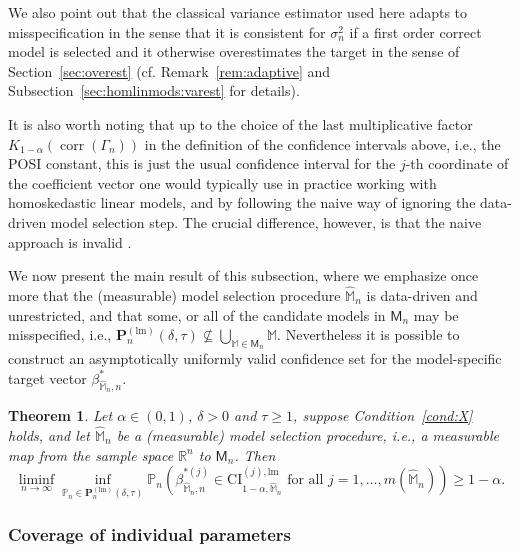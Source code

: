 \documentclass[preprint]{imsart}
\newcommand{\R}{{\mathbb R}}
\newcommand{\M}{\mathbb M}
\DeclareMathOperator{\corr}{corr}
\newtheorem{theorem}{Theorem}[section]
\numberwithin{equation}{section}
\begin{document}
We also point out that the classical variance estimator used here adapts to misspecification in the sense that it is consistent for $\sigma_n^2$ if a first order correct model is selected and it otherwise overestimates the target in the sense of Section~\ref{sec:overest} (cf. Remark~\ref{rem:adaptive} and Subsection~\ref{sec:homlinmods:varest} for details). 
 
It is also worth noting that up to the choice of the last multiplicative factor $K_{1-\alpha}(\corr(\Gamma_n))$ in the definition of the confidence intervals above, i.e., the POSI constant, this is just the usual confidence interval for the $j$-th coordinate of the coefficient vector one would typically use in practice working with homoskedastic linear models, and by following the naive way of ignoring the data-driven model selection step. The crucial difference, however, is that the naive approach is invalid \citep[see, e.g.,][]{leeb13various, bachoc14valid}.

We now present the main result of this subsection, where we emphasize once more that the (measurable) model selection procedure $\hat{\M}_n$ is data-driven and unrestricted, and that some, or all of the candidate models in $\mathsf{M}_n$ may be misspecified, i.e., $\mathbf{P}_n^{(\mathrm{lm})} \left(\delta, \tau \right) \not \subseteq \bigcup_{\M\in\mathsf{M}_n}\M$. Nevertheless it is possible to construct an asymptotically uniformly valid confidence set for the model-specific target vector $\beta_{\hat{\M}_n,n}^*$. 
%
\begin{theorem}\label{thm:homlinmods}
Let $\alpha \in (0, 1)$, $\delta > 0$ and $\tau \ge 1$, suppose Condition~\ref{cond:X} holds, and let $\hat{\mathbb{M}}_n$ be a (measurable) model selection procedure, i.e., a measurable map from the sample space $\R^n$ to $\mathsf{M}_n$. Then
%
\begin{equation*}
\liminf_{n \to \infty} \inf_{\mathbb{P}_n \in \mathbf{P}_n^{(\mathrm{lm})} \left(\delta, \tau \right)} \mathbb{P}_n \left(\beta_{\hat{\mathbb{M}}_n, n}^{* (j)} \in \mathrm{CI}_{1-\alpha, \hat{\mathbb{M}}_n}^{(j), \mathrm{lm}} \text{ for all } j = 1, \hdots, m(\hat{\mathbb{M}}_n)  \right) \geq 1-\alpha.
\end{equation*}
%
\end{theorem}

\subsubsection{Coverage of individual parameters}\label{sec:individual}
\end{document}
